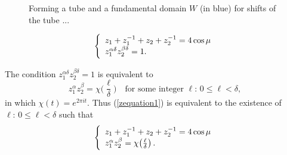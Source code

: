 \documentclass[12pt]{article}
\newcommand{\cchi}[1]{{\textstyle{\chi\big(#1\big)}}}
\begin{document}
\begin{figure}  %
\centerline{}
\caption{\small Forming a tube and a fundamental domain $W$ (in blue) for shifts of the tube ...}
\label{fig:Tube}
\end{figure}



%
\begin{equation}\label{zequation1}
  \renewcommand{\arraystretch}{1.1}
\left\{
  \begin{array}{l}
    z_1 + z_1^{-1} + z_2 + z_2^{-1} = 4\cos\mu \\
    z_1^{\alpha\delta} z_2^{\beta\delta} = 1.
  \end{array}
\right.
\end{equation}
%

The condition $z_1^{\alpha\delta} z_2^{\beta\delta} = 1$ is equivalent to 
%
\begin{equation}
  z_1^\alpha z_2^\beta = \cchi{\frac{\ell}{\delta}}
  \quad \text{for some integer } \ell:\,0\leq\ell<\delta,
\end{equation}
%
in which $\chi(t) = e^{2\pi it}$.  Thus (\ref{zequation1}) is equivalent to the existence of $\ell:\,0\leq\ell<\delta$ such that
%
\begin{equation}\label{zequation2}
  \renewcommand{\arraystretch}{1.1}
\left\{
  \begin{array}{l}
    z_1 + z_1^{-1} + z_2 + z_2^{-1} = 4\cos\mu \\
    z_1^\alpha z_2^\beta = \chi\!\left( \frac{\ell}{\delta} \right). \\
  \end{array}
\right.
\end{equation}
%
\end{document}
